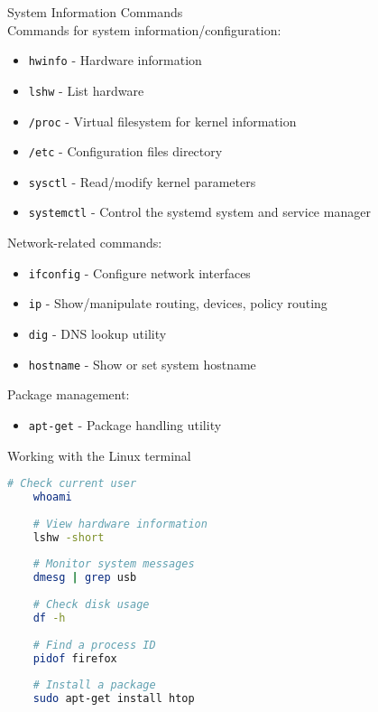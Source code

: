 \begin{definition}{System Information Commands}\\
    Commands for system information/configuration:
    \begin{itemize}
        \item \texttt{hwinfo} - Hardware information
        \item \texttt{lshw} - List hardware
        \item \texttt{/proc} - Virtual filesystem for kernel information
        \item \texttt{/etc} - Configuration files directory
        \item \texttt{sysctl} - Read/modify kernel parameters
        \item \texttt{systemctl} - Control the systemd system and service manager
    \end{itemize}
    
    Network-related commands:
    \begin{itemize}
        \item \texttt{ifconfig} - Configure network interfaces
        \item \texttt{ip} - Show/manipulate routing, devices, policy routing
        \item \texttt{dig} - DNS lookup utility
        \item \texttt{hostname} - Show or set system hostname
    \end{itemize}
    
    Package management:
    \begin{itemize}
        \item \texttt{apt-get} - Package handling utility
    \end{itemize}
\end{definition}

\begin{example2}
    {Working with the Linux terminal}
    
    \begin{lstlisting}[language=bash, style=basesmol]
    # Check current user
    whoami
    
    # View hardware information
    lshw -short
    
    # Monitor system messages
    dmesg | grep usb
    
    # Check disk usage
    df -h
    
    # Find a process ID
    pidof firefox
    
    # Install a package
    sudo apt-get install htop
    \end{lstlisting}
\end{example2}

